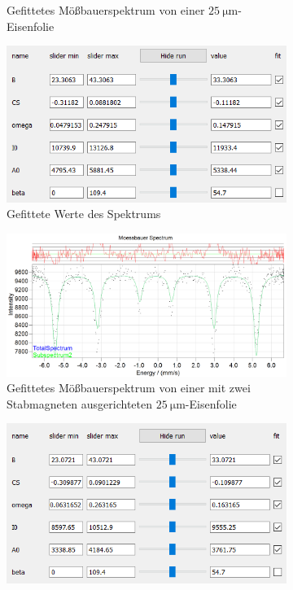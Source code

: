 \documentclass[german, %
parskip=full, %
bibliography=totoc, %
]{scrartcl}
\begin{document}
\begin{figure}[ht]
\begin{subfigure}[b]{0.5\textwidth}
	  \caption{Gefittetes Mößbauerspektrum von einer \(\SI{25}{\micro\meter}\)-Eisenfolie}
	  \label{fig:moess25nB}
  \end{subfigure}
  \begin{subfigure}[b]{0.4\textwidth}
	  \includegraphics[width=\textwidth]{WerteEisen25reinB}
	  \caption{Gefittete Werte des Spektrums}
	  \label{fig:werte25nB}
  \end{subfigure}
	\begin{subfigure}[b]{0.5\textwidth}
		\includegraphics[width=\textwidth]{MoessbauerEisen25MagnetGeradereinB}
	  \caption{Gefittetes Mößbauerspektrum von einer mit zwei Stabmagneten ausgerichteten \(\SI{25}{\micro\meter}\)-Eisenfolie}
	  \label{fig:moess25geradenB}
  \end{subfigure}
  \begin{subfigure}[b]{0.4\textwidth}
	  \includegraphics[width=\textwidth]{WerteEisen25MagnetGeradereinB}

\end{subfigure}
\end{figure}
\end{document}
